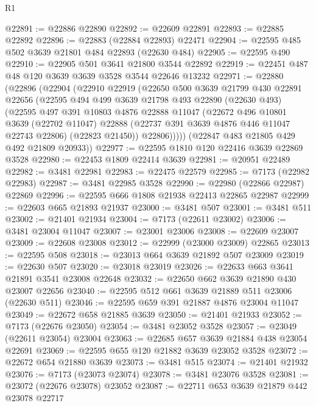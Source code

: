 \begin{lexlean}{R1}
\begin{coremodule}
@22891 := @22886 @22890
@22892 := @22609 @22891
@22893 := @22885 @22892
@22896 := @22883 (@22884 @22893) @22471
@22904 := @22595 @485 @502 @3639 @21801 @484 @22893 (@22630 @484)
@22905 := @22595 @490
@22910 := @22905 @501 @3641 @21800 @3544 @22892
@22919 := @22451 @487 @48 @120 @3639 @3639 @3528 @3544 @22646 @13232
@22971 := @22880
    (@22896
      (@22904
        (@22910
          @22919
          (@22650
            @500
            @3639
            @21799
            @430
            @22891
            @22656
            (@22595
              @494
              @499
              @3639
              @21798
              @493
              @22890
              (@22630 @493)
              (@22595
                @497
                @391
                @10803
                @4876
                @22888
                @11047
                (@22672
                  @496
                  @10801
                  @3639
                  (@22702 @11047)
                  @22888
                  (@22737 @391 @3639 @4876 @446 @11047 @22743 @22806)
                  (@22823 @21450))
                @22806)))))
      (@22847 @483 @21805 @429 @492 @21809 @20933))
@22977 := @22595 @1810 @120 @22416 @3639 @22869 @3528
@22980 := @22453 @1809 @22414 @3639
@22981 := @20951 @22489
@22982 := @3481 @22981
@22983 := @22475 @22579
@22985 := @7173 (@22982 @22983)
@22987 := @3481 @22985 @3528
@22990 := @22980 (@22866 @22987) @22869
@22996 := @22595 @666 @1808 @21938 @22413 @22865 @22987
@22999 := @22603 @665 @21893 @21937
@23000 := @3481 @507
@23001 := @3481 @511
@23002 := @21401 @21934
@23004 := @7173 (@22611 @23002)
@23006 := @3481 @23004 @11047
@23007 := @23001 @23006
@23008 := @22609 @23007
@23009 := @22608 @23008
@23012 := @22999 (@23000 @23009) @22865
@23013 := @22595 @508
@23018 := @23013 @664 @3639 @21892 @507 @23009
@23019 := @22630 @507
@23020 := @23018 @23019
@23026 := @22633 @663 @3641 @21891 @3541 @23008 @22648
@23032 := @22650 @662 @3639 @21890 @430 @23007 @22656
@23040 := @22595 @512 @661 @3639 @21889 @511 @23006 (@22630 @511)
@23046 := @22595 @659 @391 @21887 @4876 @23004 @11047
@23049 := @22672 @658 @21885 @3639
@23050 := @21401 @21933
@23052 := @7173 (@22676 @23050)
@23054 := @3481 @23052 @3528
@23057 := @23049 (@22611 @23054) @23004
@23063 := @22685 @657 @3639 @21884 @438 @23054 @22691
@23069 := @22595 @655 @120 @21882 @3639 @23052 @3528
@23072 := @22672 @654 @21880 @3639
@23073 := @3481 @515
@23074 := @21401 @21932
@23076 := @7173 (@23073 @23074)
@23078 := @3481 @23076 @3528
@23081 := @23072 (@22676 @23078) @23052
@23087 := @22711 @653 @3639 @21879 @442 @23078 @22717

\end{coremodule}
\end{lexlean}

